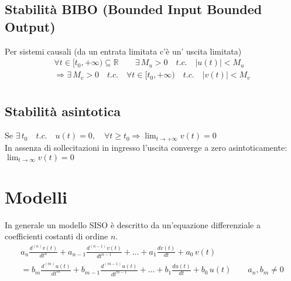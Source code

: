 \subsection{Stabilità BIBO (Bounded Input Bounded Output)}\label{sist_prop_BIBOstab}
	
	Per sistemi causali (da un entrata limitata c'è un' uscita limitata)
	\[
	\begin{split}
		\forall t \in [t_0, + \infty) \subseteq \mathbb{R} \qquad \exists \, M_u >0 \quad t.c. \quad \lvert u(t) \rvert < M_u \\
		\Rightarrow \exists \, M_v > 0 \quad t.c. \quad \forall t \in [t_0, + \infty) \quad t.c. \quad \lvert v(t) \rvert < M_v\\
	\end{split}		
	\]
	
\subsection{Stabilità asintotica}
	Se $\exists \, t_0 \quad t.c. \quad u(t)=0, \quad \forall t \ge t_0 \Rightarrow \lim_{t \to +\infty} v(t)=0$\\
	In assenza di sollecitazioni in ingresso l'uscita converge a zero asintoticamente: $\lim_{t \to \infty} v(t)=0$
	


	
\section{Modelli}

In generale un modello SISO è descritto da un'equazione differenziale a coefficienti costanti di ordine $n$.
\begin{multline}
	a_n \frac{d^{(n)} v(t)}{dt^n} 
		+ a_{n-1} \frac{d^{(n-1)} v(t)}{dt^{n-1}} 
		+ \dots 
		+ a_1 \frac{dv(t)}{dt} 
		+ a_0\,v(t)\\
	= b_m \frac{d^{(m)} u(t)}{dt^m}
		+ b_{m-1} \frac{d^{(m-1)} u(t)}{dt^{m-1}} 
		+ \dots
		+ b_1 \frac{du(t)}{dt} 
		+ b_0\,u(t) \qquad
	a_n, b_m \ne 0	
\tag{2}\label{equation 2}
\end{multline}

